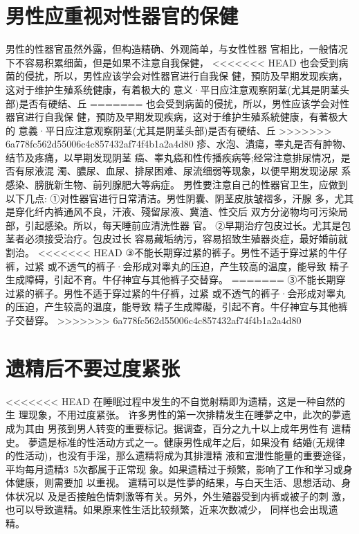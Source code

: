 \documentclass[12pt,UTF8]{ctexbook}
\begin{document}
\section{男性应重视对性器官的保健}

男性的性器官虽然外露，但构造精确、外观简单，与女性性器
官相比，一般情况下不容易积累细菌，但是如果不注意自我保健，
<<<<<<< HEAD
也会受到病菌的侵扰，所以，男性应该学会对性器官进行自我保
健，預防及早期发现疾病，这对于维护生殖系统健康，有着极大的
意义·平日应注意观察阴茎(尤其是阴茎头部)是否有硬结、丘
=======
也会受到病菌的侵扰，所以，男性应该学会对性器官进行自我保
健，預防及早期发现疾病，这对于维护生殖系統健康，有著极大的
意義·平日应注意观察阴茎(尤其是阴茎头部)是否有硬结、丘
>>>>>>> 6a778fc562d55006c4c857432af74f4b1a2a4d80
疹、水泡、潰瘍，睾丸是否有肿物、结节及疼痛，以早期发现阴茎
癌、睾丸癌和性传播疾病等;经常注意排尿情况，是否有尿液混
濁、膿尿、血尿、排尿困难、尿流细弱等现象，以便早期发现泌尿
系感染、膀胱新生物、前列腺肥大等病症。
男性要注意自己的性器官卫生，应做到以下几点:
①对性器官进行日常清洁。男性阴囊、阴茎皮肤皱褶多，汗腺
多，尤其是穿化纤内裤通风不良，汗液、殘留尿液、冀渣、性交后
双方分泌物均可污染局部，引起感染。所以，每天睡前应清洗性器
官。
②早期治疗包皮过长。尤其是包茎者必须接受治疗。包皮过长
容易藏垢纳污，容易招致生殖器炎症，最好婚前就割治。
<<<<<<< HEAD
③不能长期穿过紧的裤子。男性不适于穿过紧的牛仔裤，过紧
或不透气的裤子·会形成对睾丸的压迫，产生较高的温度，能导致
精子生成障碍，引起不育。牛仔神宜与其他裤子交替穿。
=======
③不能长期穿过紧的裤子。男性不适于穿过紧的牛仔裤，过紧
或不透气的裤子·会形成对睾丸的压迫，产生较高的温度，能导致
精子生成障礙，引起不育。牛仔神宜与其他裤子交替穿。
>>>>>>> 6a778fc562d55006c4c857432af74f4b1a2a4d80

\section{遗精后不要过度紧张}

<<<<<<< HEAD
在睡眠过程中发生的不自觉射精即为遗精，这是一种自然的生
理现象，不用过度紧张。
许多男性的第一次排精发生在睡夢之中，此次的夢遗成为其由
男孩到男人转变的重要标记。据调查，百分之九十以上成年男性有
遣精史。
夢遗是标准的性活动方式之一。健康男性成年之后，如果没有
结婚(无规律的性活动)，也没有手淫，那么遗精将成为其排泄精
液和宣泄性能量的重要途径，平均每月遗精3~5次都属于正常现
象。如果遗精过于频繁，影响了工作和学习或身体健康，则需要加
以重视。
遣精可以是性夢的结果，与白天生活、思想活动、身体状况以
及是否接触色情刺激等有关。另外，外生殖器受到内裤或被子的刺
激，也可以导致遣精。如果原来性生活比较频繁，近来次数减少，
同样也会出现遗精。
\end{document}
